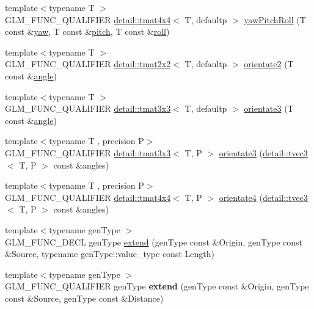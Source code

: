 \begin{DoxyCompactItemize}
\item 
{\footnotesize template$<$typename T $>$ }\\G\+L\+M\+\_\+\+F\+U\+N\+C\+\_\+\+Q\+U\+A\+L\+I\+F\+I\+ER \hyperlink{structglm_1_1detail_1_1tmat4x4}{detail\+::tmat4x4}$<$ T, defaultp $>$ \hyperlink{group__gtx__euler__angles_gaf6f927d06835272cd6a61ee3f8f65f5e}{yaw\+Pitch\+Roll} (T const \&\hyperlink{group__gtc__quaternion_ga1de7653ddf380ff06d2300eea831664c}{yaw}, T const \&\hyperlink{group__gtc__quaternion_ga4d345dc369a54f53f5ebc375bac56d11}{pitch}, T const \&\hyperlink{group__gtc__quaternion_ga6d883e423bc425f4334fcce202131f7e}{roll})
\item 
{\footnotesize template$<$typename T $>$ }\\G\+L\+M\+\_\+\+F\+U\+N\+C\+\_\+\+Q\+U\+A\+L\+I\+F\+I\+ER \hyperlink{structglm_1_1detail_1_1tmat2x2}{detail\+::tmat2x2}$<$ T, defaultp $>$ \hyperlink{group__gtx__euler__angles_gab39476f0decc117783e02ba389a04ee7}{orientate2} (T const \&\hyperlink{group__gtc__quaternion_ga23a3fc7ada5bbb665ff84c92c6e0542c}{angle})
\item 
{\footnotesize template$<$typename T $>$ }\\G\+L\+M\+\_\+\+F\+U\+N\+C\+\_\+\+Q\+U\+A\+L\+I\+F\+I\+ER \hyperlink{structglm_1_1detail_1_1tmat3x3}{detail\+::tmat3x3}$<$ T, defaultp $>$ \hyperlink{group__gtx__euler__angles_ga2c94907d441c40beb413fe3284c1b267}{orientate3} (T const \&\hyperlink{group__gtc__quaternion_ga23a3fc7ada5bbb665ff84c92c6e0542c}{angle})
\item 
{\footnotesize template$<$typename T , precision P$>$ }\\G\+L\+M\+\_\+\+F\+U\+N\+C\+\_\+\+Q\+U\+A\+L\+I\+F\+I\+ER \hyperlink{structglm_1_1detail_1_1tmat3x3}{detail\+::tmat3x3}$<$ T, P $>$ \hyperlink{group__gtx__euler__angles_gab6a2a986916647ddedc94bbd2516f20c}{orientate3} (\hyperlink{structglm_1_1detail_1_1tvec3}{detail\+::tvec3}$<$ T, P $>$ const \&angles)
\item 
{\footnotesize template$<$typename T , precision P$>$ }\\G\+L\+M\+\_\+\+F\+U\+N\+C\+\_\+\+Q\+U\+A\+L\+I\+F\+I\+ER \hyperlink{structglm_1_1detail_1_1tmat4x4}{detail\+::tmat4x4}$<$ T, P $>$ \hyperlink{group__gtx__euler__angles_ga3b9f62da9726cdad708df41712792082}{orientate4} (\hyperlink{structglm_1_1detail_1_1tvec3}{detail\+::tvec3}$<$ T, P $>$ const \&angles)
\item 
{\footnotesize template$<$typename gen\+Type $>$ }\\G\+L\+M\+\_\+\+F\+U\+N\+C\+\_\+\+D\+E\+CL gen\+Type \hyperlink{group__gtx__extend_ga8140caae613b0f847ab0d7175dc03a37}{extend} (gen\+Type const \&Origin, gen\+Type const \&Source, typename gen\+Type\+::value\+\_\+type const Length)
\item 
{\footnotesize template$<$typename gen\+Type $>$ }\\G\+L\+M\+\_\+\+F\+U\+N\+C\+\_\+\+Q\+U\+A\+L\+I\+F\+I\+ER gen\+Type {\bfseries extend} (gen\+Type const \&Origin, gen\+Type const \&Source, gen\+Type const \&Distance)\hypertarget{namespaceglm_a88c4890406fab3280de470ce780e6b9d}{}\label{namespaceglm_a88c4890406fab3280de470ce780e6b9d}


\end{DoxyCompactItemize}
